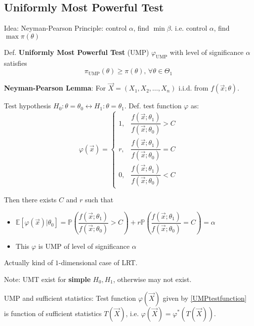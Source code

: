 \subsection{Uniformly Most Powerful Test}\label{SUbSectionUMP}
    Idea: Neyman-Pearson Principle: control $\alpha$, find $\min\beta$. i.e. control $\alpha$, find $\max\pi(\theta)$

    Def. \textbf{Uniformly Most Powerful Test} (UMP) $\varphi_{\mathrm{UMP}}$ with level of significance $\alpha$ satisfies
    \begin{equation}
        \pi_{\mathrm{UMP}}(\theta)\geq\pi(\theta),\,\forall\theta\in\Theta_1
    \end{equation}

    \textbf{Neyman-Pearson Lemma}: For $\vec{X}=(X_1,X_2,\ldots,X_n)$ i.i.d. from $f(\vec{x};\theta)$. 
    
    Test hypothesis $H_0:\theta=\theta_0\longleftrightarrow H_1:\theta=\theta_1$. Def. test function $\varphi$ as:
    \begin{equation}\label{UMPtestfunction}
        \varphi(\vec{x})=\begin{cases}
            1,&\dfrac{f(\vec{x};\theta_1)}{f(\vec{x};\theta_0)}>C\\
            r,&\dfrac{f(\vec{x};\theta_1)}{f(\vec{x};\theta_0)}=C\\
            0,&\dfrac{f(\vec{x};\theta_1)}{f(\vec{x};\theta_0)}<C
        \end{cases}
    \end{equation}

    Then there exists $C$ and $r$ such that
    \begin{itemize}
        \item $\mathbb{E}[\varphi(\vec{x})|\theta_0]=\mathbb{P}(\dfrac{f(\vec{x};\theta_1)}{f(\vec{x};\theta_0)}>C)+r\mathbb{P}(\dfrac{f(\vec{x};\theta_1)}{f(\vec{x};\theta_0)}=C)=\alpha$
        \item This $\varphi$ is UMP of level of significance $\alpha$
    \end{itemize}

    Actually kind of $1$-dimensional case of LRT.

    Note: UMT exist for\textbf{ simple }$H_0,H_1$, otherwise may not exist.

    UMP and sufficient statistics: Test function $\varphi(\vec{X})$ given by \autoref{UMPtestfunction} is function of sufficient statistics $T(\vec{X})$, i.e. $\varphi(\vec{X})=\varphi^*(T(\vec{X}))$.

